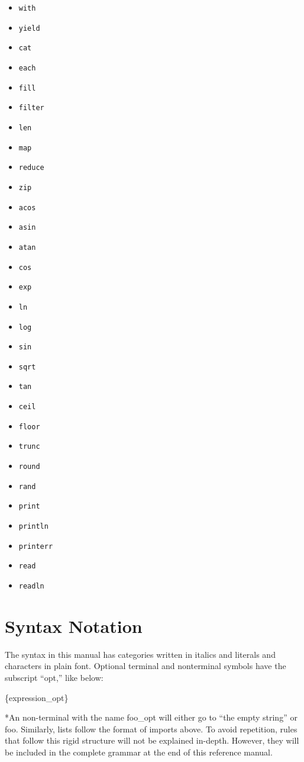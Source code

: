 \begin{itemize}
	\item{\verb=with=}
	\item{\verb=yield=}
	\item{\verb=cat=}
	\item{\verb=each=}
	\item{\verb=fill=}
	\item{\verb=filter=}
	\item{\verb=len=}
	\item{\verb=map=}
	\item{\verb=reduce=}
	\item{\verb=zip=}
	\item{\verb=acos=}
	\item{\verb=asin=}
	\item{\verb=atan=}
	\item{\verb=cos=}
	\item{\verb=exp=}
	\item{\verb=ln=}
	\item{\verb=log=}
	\item{\verb=sin=}
	\item{\verb=sqrt=}
	\item{\verb=tan=}
	\item{\verb=ceil=}
	\item{\verb=floor=}
	\item{\verb=trunc=}
	\item{\verb=round=}
	\item{\verb=rand=}
	\item{\verb=print=}
	\item{\verb=println=}
	\item{\verb=printerr=}
	\item{\verb=read=}
	\item{\verb=readln=}
\end{itemize}

\section{Syntax Notation}
The syntax in this manual has categories written in italics and literals and characters in
plain font. Optional terminal and nonterminal symbols have the subscript ``opt,'' like below:

\centerline{\{expression\_opt\}}

*An non-terminal with the name foo\_opt will either go to ``the empty string'' or foo. Similarly, lists follow the format of imports above. To avoid repetition, rules that follow this rigid structure will not be explained in-depth. However, they will be included in the complete grammar at the end of this reference manual.
